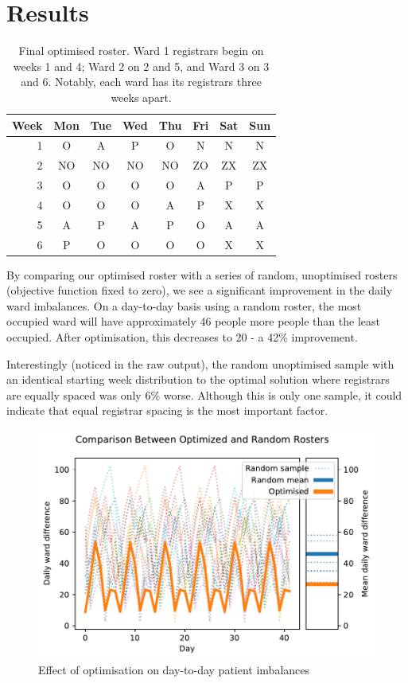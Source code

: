 \documentclass[a4paper]{article}
\begin{document}
\section{Results}
\begin{table}[H]
\centering
\caption{Final optimised roster. Ward 1 registrars begin on weeks 1 and 4; Ward 2 on 2 and 5, and Ward 3 on 3 and 6. Notably, each ward has its registrars three weeks apart.}
\label{tab:roster}
\begin{tabular}{r|ccccccc}
Week & Mon & Tue & Wed & Thu & Fri & Sat & Sun \\
\hline
 1	&O	&A	&P	&O	&N	&N	&N	\\
 2	&NO	&NO	&NO	&NO	&ZO	&ZX	&ZX	\\
 3	&O	&O	&O	&O	&A	&P	&P	\\
 4	&O	&O	&O	&A	&P	&X	&X	\\
 5	&A	&P	&A	&P	&O	&A	&A	\\
 6	&P	&O	&O	&O	&O	&X	&X	\\
\end{tabular}
\end{table}
\begin{multicols}{2}

By comparing our optimised roster with a series of random, unoptimised rosters (objective function fixed to zero), we see a significant improvement in the daily ward imbalances. On a day-to-day basis using a random roster, the most occupied ward will have approximately 46 people more people than the least occupied. After optimisation, this decreases to 20 - a 42\% improvement.

Interestingly (noticed in the raw output), the random unoptimised sample with an identical starting week distribution to the optimal solution where registrars are equally spaced was only 6\% worse. Although this is only one sample, it could indicate that equal registrar spacing is the most important factor.

\begin{figure}[H]
    \centering\includegraphics[width=\linewidth]{../results/comparison}
    \caption{Effect of optimisation on day-to-day patient imbalances}
    \label{fig:comparison}
\end{figure}

\end{multicols}
\end{document}
